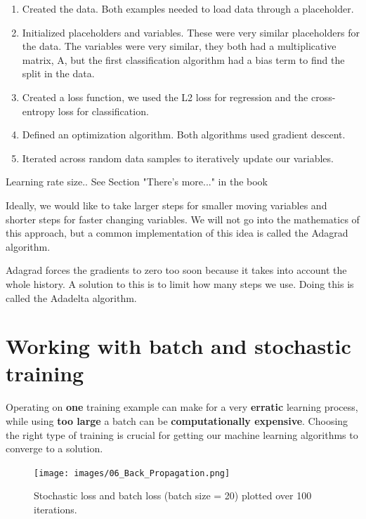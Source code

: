 \documentclass{article}
\begin{document}
\begin{enumerate}
\item Created the data. Both examples needed to load data through a placeholder.

\item Initialized placeholders and variables. These were very similar placeholders for the data. The variables were very similar, they both had a multiplicative matrix, A, but the first classification algorithm had a bias term to find the split in the data.

\item Created a loss function, we used the L2 loss for regression and the cross-entropy loss for classification.


\item Defined an optimization algorithm. Both algorithms used gradient descent.

\item Iterated across random data samples to iteratively update our variables.
\end{enumerate}


Learning rate size.. See Section "There's more..." in the book

Ideally, we would like to take larger steps for smaller moving variables and shorter steps for faster changing variables. We will not go into the mathematics of this approach, but a common implementation of this idea is called the Adagrad algorithm.

Adagrad forces the gradients to zero too soon because it takes into account the whole history. A solution to this is to limit how many steps we use. Doing this is called the Adadelta algorithm.

\section{Working with batch and stochastic training}
Operating on \textbf{one} training example can make for a very \textbf{erratic} learning process, while using \textbf{too large} a batch can be \textbf{computationally expensive}. Choosing the right type of training is crucial for getting our machine learning algorithms to converge to a solution.

\begin{figure}[H]
  \centering
  \texttt{[image: images/06\_Back\_Propagation.png]}
  \caption{Stochastic loss and batch loss (batch size = 20) plotted over 100 iterations.}
\end{figure}
\end{document}
